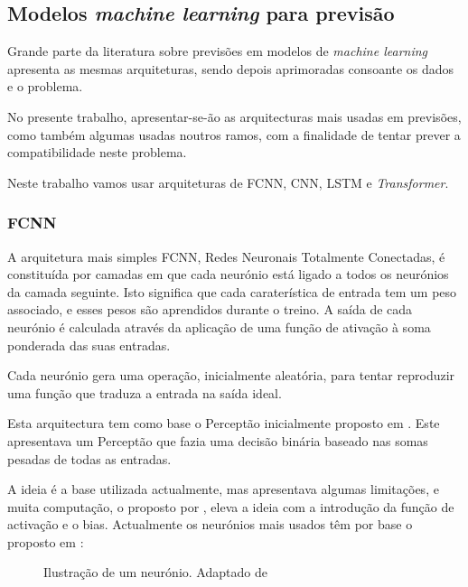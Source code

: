 \subsection{Modelos \textit{machine learning} para previsão\label{se:arquiteturas_modelos}}

Grande parte da literatura sobre previsões em modelos de \textit{machine learning} apresenta as mesmas arquiteturas, sendo depois aprimoradas consoante os dados e o problema.\par
No presente trabalho, apresentar-se-ão as arquitecturas mais usadas em previsões, como também algumas usadas noutros ramos, com a finalidade de tentar prever a compatibilidade neste problema.\par
Neste trabalho vamos usar arquiteturas de \gls{FCNN}, \gls{CNN}, \gls{LSTM} e \textit{Transformer}.\par




\subsubsection{FCNN\label{se:fcnn_sec}}

A arquitetura mais simples \gls{FCNN}, Redes Neuronais Totalmente Conectadas, é constituída por camadas em que cada neurónio está ligado a todos os neurónios da camada seguinte. Isto significa que cada caraterística de entrada tem um peso associado, e esses pesos são aprendidos durante o treino. A saída de cada neurónio é calculada através da aplicação de uma função de ativação à soma ponderada das suas entradas.\par
Cada neurónio gera uma operação, inicialmente aleatória, para tentar reproduzir uma função que traduza a entrada na saída ideal.\par
Esta arquitectura tem como base o Perceptão inicialmente proposto em \cite{Rosenblatt1958}. Este apresentava um Perceptão que fazia uma decisão binária baseado nas somas pesadas de todas as entradas.\par
A ideia é a base utilizada actualmente, mas apresentava algumas limitações, e muita computação, o proposto por \cite{Minsky1969}, eleva a ideia com a introdução da função de activação e o bias. Actualmente os neurónios mais usados têm por base o proposto em \cite{Haykin1999}:


\begin{figure}[H]
	\centering
	\resizebox{0.7\linewidth}{!}{}
	\caption{Ilustração de um neurónio. Adaptado de \cite{Haykin1999}}
	\label{fig:neuronio}
\end{figure}



